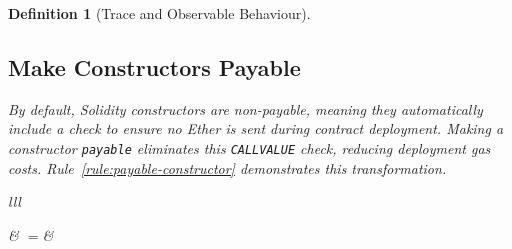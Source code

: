 \documentclass[manuscript,screen,review]{acmart}
\newtheorem{definition}{Definition}
\begin{document}
\begin{definition}[Trace and Observable Behaviour]
\subsection{Make Constructors Payable}

By default, Solidity constructors are non-payable, meaning they automatically include a check to ensure no Ether is sent during contract deployment. Making a constructor \texttt{payable} eliminates this \texttt{CALLVALUE} check, reducing deployment gas costs. Rule~\ref{rule:payable-constructor} demonstrates this transformation.

\begin{refactoring}[h!]
\begin{footnotesize}
\begin{tabular}{lll}

   & $=$&


\end{tabular}
\end{footnotesize}
\end{refactoring}
\end{definition}
\end{document}
